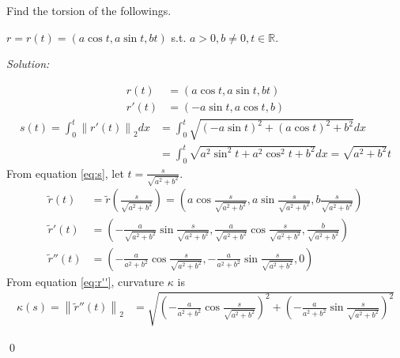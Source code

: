 \documentclass[12pt]{article}
\newenvironment{problem}[2][Problem]{\begin{trivlist}
\item[\hskip \labelsep {\bfseries #1}\hskip \labelsep {\bfseries #2.}]}{\end{trivlist}}
\newenvironment{sol}
{\emph{Solution:}
}
{
    \qed
    }
\begin{document}




Find the torsion of the followings.
\begin{problem}{1} 
    $r=r(t)=(a \cos t, a \sin t, bt)$ s.t. $a>0, b \neq 0, t \in \mathbb{R}$.
\end{problem}

\begin{sol}

\begin{align*}
    r(t)  &= (a \cos{t}, a \sin{t}, bt) \\
    r'(t) &= (-a \sin{t}, a \cos{t}, b)
\end{align*}
\begin{align}
    s(t) = \int_0^t \left\lVert r'(t) \right\rVert_2 dx 
        &= \int_0^t \sqrt{(-a \sin{t})^2 + (a \cos{t})^2+b ^2} dx \nonumber \\
        &= \int_0^t \sqrt{a^2 \sin^2{t} + a^2 \cos^2{t} + b^2} dx = \sqrt{a^2+b^2}t \label{eq:s} 
\end{align}
From equation \ref{eq:s}, let $t=\frac{s}{\sqrt{a^2+b^2}}$.
\begin{align}
    \tilde{r}(t)   &= \tilde{r} \left(\frac{s}{\sqrt{a^2+b^2}} \right) 
                        = \left(a \cos{\frac{s}{\sqrt{a^2+b^2}}}, 
                                a \sin{\frac{s}{\sqrt{a^2+b^2}}}, 
                                b \frac{s}{\sqrt{a^2+b^2}}\right) \nonumber\\
    \tilde{r}'(t)  &= \left(-\frac{a}{\sqrt{a^2+b^2}} \sin{\frac{s}{\sqrt{a^2+b^2}}}, 
                             \frac{a}{\sqrt{a^2+b^2}} \cos{\frac{s}{\sqrt{a^2+b^2}}}, 
                            \frac{b}{\sqrt{a^2+b^2}} \right) \nonumber\\
    \tilde{r}''(t) &= \left(-\frac{a}{a^2+b^2} \cos{\frac{s}{\sqrt{a^2+b^2}}}, 
                            -\frac{a}{a^2+b^2} \sin{\frac{s}{\sqrt{a^2+b^2}}}, 
                            0 \right) \label{eq:r''}
\end{align}
From equation \ref{eq:r''}, curvature $\kappa$ is
\begin{align}
    \kappa(s) = \left\lVert \tilde{r}''(t) \right\rVert_2 
        &= \sqrt{
            \left( -\frac{a}{a^2+b^2} \cos{\frac{s}{\sqrt{a^2+b^2}}} \right)^2
            + \left( -\frac{a}{a^2+b^2} \sin{\frac{s}{\sqrt{a^2+b^2}}} \right)^2
}
\end{align}
\end{sol}
\end{document}
